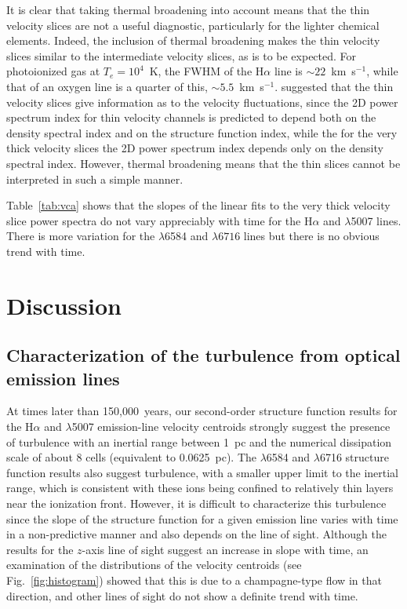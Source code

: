 \documentclass[useAMS,usenatbib]{mn2e}
\begin{document}
It is clear that taking thermal broadening into account means that the
thin velocity slices are not a useful diagnostic, particularly for the
lighter chemical elements. Indeed, the inclusion of thermal
broadening makes the thin velocity slices similar to the intermediate
velocity slices, as is to be expected. For photoionized gas at $T_e= 10^4$~K, the
FWHM of the H$\alpha$ line is $\sim 22$~km~s$^{-1}$, while that of an
oxygen line is a quarter of this, $\sim
5.5$~km~s$^{-1}$. \citet{2000ApJ...537..720L}  
suggested that the thin velocity slices give information as to the
velocity fluctuations, since the 2D power spectrum index for thin
velocity channels is predicted to depend both on the density spectral
index and on the structure function index, while the for the very thick
velocity slices the 2D power spectrum index depends only on the density spectral index. However,
thermal broadening means that the thin slices cannot be interpreted in
such a simple manner. 

Table~\ref{tab:vca} shows that the slopes of the linear fits to the very
thick velocity slice power spectra do not vary appreciably with time
for the H$\alpha$ and \oiii$\lambda$5007 lines. There is more
variation for the \nii$\lambda$6584 and \sii$\lambda6716$ lines but
there is no obvious trend with time.


\section{Discussion}
\label{sec:discuss}

\subsection{Characterization of the turbulence from optical emission
  lines}
\label{subsec:charac}
At times later than 150,000~years, our second-order structure function
results for the H$\alpha$ and \oiii$\lambda$5007
emission-line velocity centroids strongly suggest the presence of
turbulence with an inertial range between 1~pc and the numerical
dissipation scale of about 8 cells (equivalent to 0.0625~pc). The
\nii$\lambda$6584 and
\sii$\lambda$6716 structure function results also suggest turbulence, with a smaller upper limit to the inertial range,
which is consistent with these ions being confined to relatively thin
layers near the ionization front. However, it is difficult
to characterize this turbulence since the slope of the structure
function for a given emission line varies with time in a
non-predictive manner and also depends on the line of sight. Although
the results for the $z$-axis line of sight suggest an increase in
slope with time, an examination of the distributions of the velocity centroids
(see Fig.~\ref{fig:histogram}) showed that this is due to a champagne-type
flow in that direction, and other lines of sight do not show a
definite trend with time.
\end{document}
